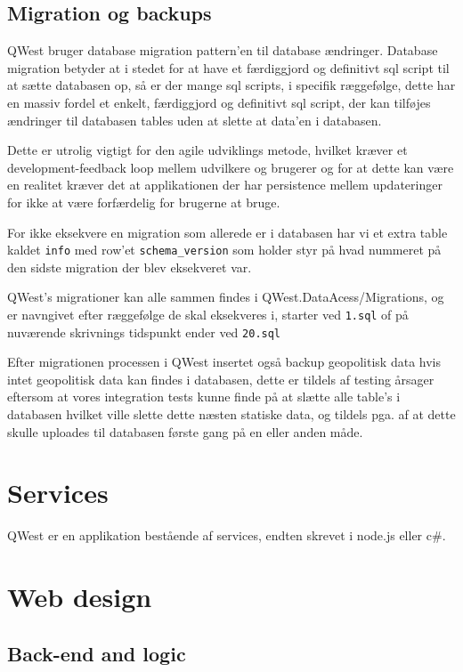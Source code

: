 \subsection{Migration og backups}\label{sec:migration}
QWest bruger database migration pattern'en til database ændringer.
Database migration betyder at i stedet for at have et færdiggjord og definitivt sql script til at sætte databasen op, så er der mange sql scripts, i specifik ræggefølge, dette har en massiv fordel et enkelt, færdiggjord og definitivt sql script, der kan tilføjes ændringer til databasen tables uden at slette at data'en i databasen.

Dette er utrolig vigtigt for den agile udviklings metode, hvilket kræver et development-feedback loop mellem udvilkere og brugerer og for at dette kan være en realitet kræver det at applikationen der har persistence mellem updateringer for ikke at være forfærdelig for brugerne at bruge.

For ikke eksekvere en migration som allerede er i databasen har vi et extra table kaldet \texttt{info} med row'et \texttt{schema\_version} som holder styr på hvad nummeret på den sidste migration der blev eksekveret var.

QWest's migrationer kan alle sammen findes i QWest.DataAcess/Migrations, og er navngivet efter ræggefølge de skal eksekveres i, starter ved \texttt{1.sql} of på nuværende skrivnings tidspunkt ender ved \texttt{20.sql}

Efter migrationen processen i QWest insertet også backup geopolitisk data hvis intet geopolitisk data kan findes i databasen, dette er tildels af testing årsager eftersom at vores integration tests kunne finde på at slætte alle table's i databasen hvilket ville slette dette næsten statiske data, og tildels pga. af at dette skulle uploades til databasen første gang på en eller anden måde.

\section{Services}\label{sec:servicesImp}
QWest er en applikation bestående af services, endten skrevet i node.js eller c\#.

\section{Web design}\label{sec:webdesign}
\subsection{Back-end and logic}\label{sec:backend}
